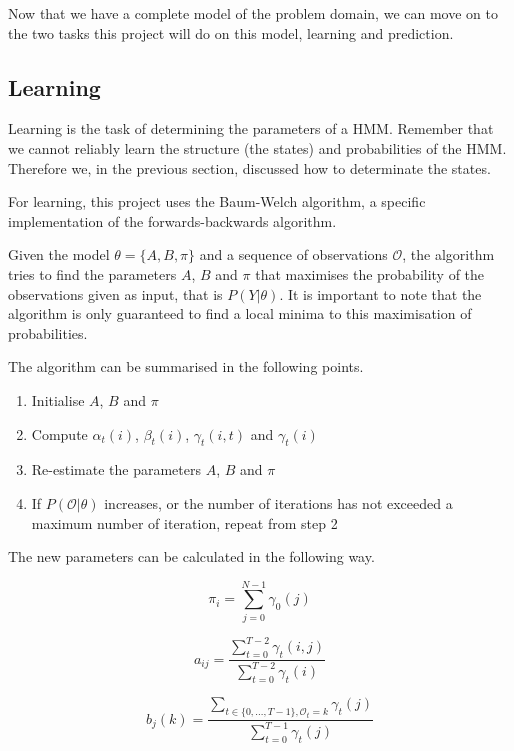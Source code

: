 Now that we have a complete model of the problem domain, we can move on to the two tasks this project will do on this model, learning and prediction.

\subsection{Learning}
Learning is the task of determining the parameters of a HMM. Remember that we cannot reliably learn the structure (the states) and probabilities of the HMM. Therefore we, in the previous section, discussed how to determinate the states.

For learning, this project uses the Baum-Welch algorithm, a specific implementation of the forwards-backwards algorithm.

Given the model $\theta = \{A, B, \pi\}$ and a sequence of observations $\mathcal{O}$, the algorithm tries to find the parameters $A$, $B$ and $\pi$ that maximises the probability of the observations given as input, that is $P(Y | \theta)$. It is important to note that the algorithm is only guaranteed to find a local minima to this maximisation of probabilities.

The algorithm can be summarised in the following points\cite{hmmIntroduction}.

\begin{enumerate}
\item Initialise $A$, $B$ and $\pi$
\item Compute $\alpha_t(i)$, $\beta_t(i)$, $\gamma_t(i,t)$ and $\gamma_t(i)$
\item Re-estimate the parameters $A$, $B$ and $\pi$
\item If $P(\mathcal{O} | \theta)$ increases, or the number of iterations has not exceeded a maximum number of iteration, repeat from step 2
\end{enumerate}

The new parameters can be calculated in the following way\cite{hmmIntroduction}.

\begin{equation*}
\pi_i = \sum\limits_{j=0}^{N-1} \gamma_0(j)
\end{equation*}

\begin{equation*}
a_{ij} = \frac{\sum\limits_{t=0}^{T-2} \gamma_t(i, j)}{ \sum\limits_{t=0}^{T-2} \gamma_t(i) }
\end{equation*}

\begin{equation*}
b_j(k) = \frac{ \sum\limits_{t \in \{0,\ldots, T-1\}, \mathcal{O}_t = k} \gamma_t(j) } { \sum\limits_{t=0}^{T-1} \gamma_t(j) }
\end{equation*}

